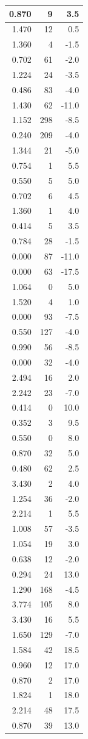 \documentclass[]{article}
\begin{document}
\begin{table}[t]
\begin{tabular}{r|r|r}
\hline
0.870 & 9 & 3.5\\
\hline
1.470 & 12 & 0.5\\
\hline
1.360 & 4 & -1.5\\
\hline
0.702 & 61 & -2.0\\
\hline
1.224 & 24 & -3.5\\
\hline
0.486 & 83 & -4.0\\
\hline
1.430 & 62 & -11.0\\
\hline
1.152 & 298 & -8.5\\
\hline
0.240 & 209 & -4.0\\
\hline
1.344 & 21 & -5.0\\
\hline
0.754 & 1 & 5.5\\
\hline
0.550 & 5 & 5.0\\
\hline
0.702 & 6 & 4.5\\
\hline
1.360 & 1 & 4.0\\
\hline
0.414 & 5 & 3.5\\
\hline
0.784 & 28 & -1.5\\
\hline
0.000 & 87 & -11.0\\
\hline
0.000 & 63 & -17.5\\
\hline
1.064 & 0 & 5.0\\
\hline
1.520 & 4 & 1.0\\
\hline
0.000 & 93 & -7.5\\
\hline
0.550 & 127 & -4.0\\
\hline
0.990 & 56 & -8.5\\
\hline
0.000 & 32 & -4.0\\
\hline
2.494 & 16 & 2.0\\
\hline
2.242 & 23 & -7.0\\
\hline
0.414 & 0 & 10.0\\
\hline
0.352 & 3 & 9.5\\
\hline
0.550 & 0 & 8.0\\
\hline
0.870 & 32 & 5.0\\
\hline
0.480 & 62 & 2.5\\
\hline
3.430 & 2 & 4.0\\
\hline
1.254 & 36 & -2.0\\
\hline
2.214 & 1 & 5.5\\
\hline
1.008 & 57 & -3.5\\
\hline
1.054 & 19 & 3.0\\
\hline
0.638 & 12 & -2.0\\
\hline
0.294 & 24 & 13.0\\
\hline
1.290 & 168 & -4.5\\
\hline
3.774 & 105 & 8.0\\
\hline
3.430 & 16 & 5.5\\
\hline
1.650 & 129 & -7.0\\
\hline
1.584 & 42 & 18.5\\
\hline
0.960 & 12 & 17.0\\
\hline
0.870 & 2 & 17.0\\
\hline
1.824 & 1 & 18.0\\
\hline
2.214 & 48 & 17.5\\
\hline
0.870 & 39 & 13.0\\
\hline
\end{tabular}
\end{table}
\end{document}
